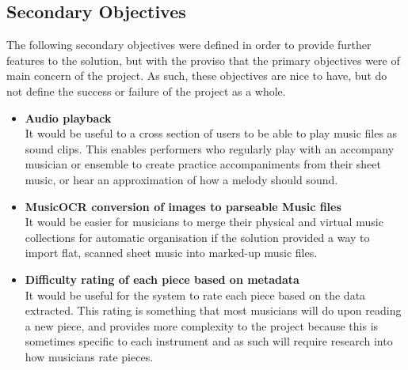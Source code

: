 \subsection{Secondary Objectives}
The following secondary objectives were defined in order to provide further features to the solution, but with the proviso that the primary objectives were of main concern of the project. As such, these objectives are nice to have, but do not define the success or failure of the project as a whole.

\begin{itemize}
    \item \textbf{Audio playback}\\
    It would be useful to a cross section of users to be able to play music files as sound clips. This enables performers who regularly play with an accompany musician or ensemble to create practice accompaniments from their sheet music, or hear an approximation of how a melody should sound.
    \item \textbf{MusicOCR conversion of images to parseable Music files}\\
It would be easier for musicians to merge their physical and virtual music collections for automatic organisation if the solution provided a way to import flat, scanned sheet music into marked-up music files. 
	\item \textbf{Difficulty rating of each piece based on metadata}\\It would be useful for the system to rate each piece based on the data extracted. This rating is something that most musicians will do upon reading a new piece, and provides more complexity to the project because this is sometimes specific to each instrument and as such will require research into how musicians rate pieces.
\end{itemize}
